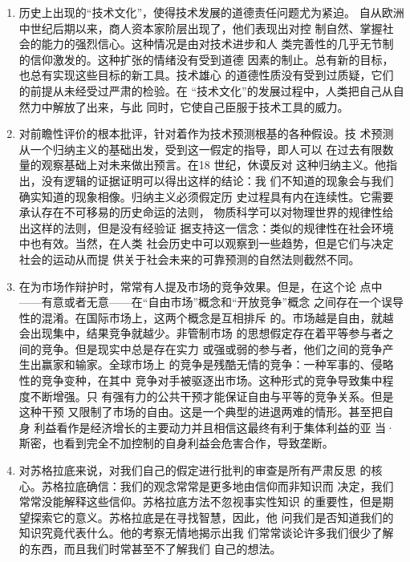 \documentclass[UTF8]{ctexart}
\begin{document}
		\begin{enumerate}
		
			\item 历史上出现的“技术文化”，使得技术发展的道德责任问题尤为紧迫。
			自从欧洲中世纪后期以来，商人资本家阶层出现了，他们表现出对控
			制自然、掌握社会的能力的强烈信心。这种情况是由对技术进步和人
			类完善性的几乎无节制的信仰激发的。这种扩张的情绪没有受到道德
			因素的制止。总有新的目标，也总有实现这些目标的新工具。技术雄心
			的道德性质没有受到过质疑，它们的前提从未经受过严肃的检验。在
			“技术文化”的发展过程中，人类把自己从自然力中解放了出来，与此
			同时，它使自己臣服于技术工具的威力。
		
			\item 对前瞻性评价的根本批评，针对着作为技术预测根基的各种假设。技
			术预测从一个归纳主义的基础出发，受到这一假定的指导，即人可以
			在过去有限数量的观察基础上对未来做出预言。在18 世纪，休谟反对
			这种归纳主义。他指出，没有逻辑的证据证明可以得出这样的结论：我
			们不知道的现象会与我们确实知道的现象相像。归纳主义必须假定历
			史过程具有内在连续性。它需要承认存在不可移易的历史命运的法则，
			物质科学可以对物理世界的规律性给出这样的法则，但是没有经验证
			据支持这一信念：类似的规律性在社会环境中也有效。当然，在人类
			社会历史中可以观察到一些趋势，但是它们与决定社会的运动从而提
			供关于社会未来的可靠预测的自然法则截然不同。
		
			\item 在为市场作辩护时，常常有人提及市场的竞争效果。但是，在这个论
			点中——有意或者无意——在“自由市场”概念和“开放竞争”概念
			之间存在一个误导性的混淆。在国际市场上，这两个概念是互相排斥
			的。市场越是自由，就越会出现集中，结果竞争就越少。非管制市场
			的思想假定存在着平等参与者之间的竞争。但是现实中总是存在实力
			或强或弱的参与者，他们之间的竞争产生出赢家和输家。全球市场上
			的竞争是残酷无情的竞争：一种军事的、侵略性的竞争变种，在其中
			竞争对手被驱逐出市场。这种形式的竞争导致集中程度不断增强。只
			有强有力的公共干预才能保证自由与平等的竞争关系。但是这种干预
			又限制了市场的自由。这是一个典型的进退两难的情形。甚至把自身
			利益看作是经济增长的主要动力并且相信这最终有利于集体利益的亚
			当·斯密，也看到完全不加控制的自身利益会危害合作，导致垄断。
	
			\item 对苏格拉底来说，对我们自己的假定进行批判的审查是所有严肃反思
			的核心。苏格拉底确信：我们的观念常常是更多地由信仰而非知识而
			决定，我们常常没能解释这些信仰。苏格拉底方法不忽视事实性知识
			的重要性，但是期望探索它的意义。苏格拉底是在寻找智慧，因此，他
			问我们是否知道我们的知识究竟代表什么。他的考察无情地揭示出我
			们常常谈论许多我们很少了解的东西，而且我们时常甚至不了解我们
			自己的想法。
			
		\end{enumerate}
	
\end{document}
